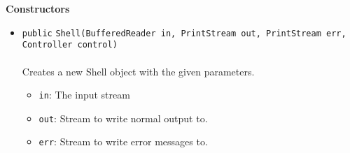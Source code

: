 \textbf{\sffamily Constructors}
\begin{itemize}
\item \lstinline|public| \lstinline|Shell|\lstinline|(BufferedReader in, PrintStream out, PrintStream err, Controller control)|\\ \\[-0.6em]
Creates a new Shell object with the given parameters.
\begin{itemize}
\item \lstinline|in|: The input stream
\item \lstinline|out|: Stream to write normal output to.
\item \lstinline|err|: Stream to write error messages to.
\end{itemize}



\end{itemize}


